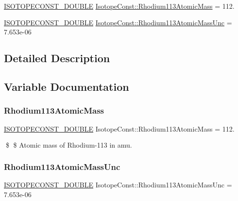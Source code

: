 \begin{DoxyCompactItemize}
\item 
\mbox{\hyperlink{group___isotope_const-_macros_ga8f45a7272ce02c0b4c65c44636ed719a}{I\+S\+O\+T\+O\+P\+E\+C\+O\+N\+S\+T\+\_\+\+D\+O\+U\+B\+LE}} \mbox{\hyperlink{group___isotope_const-_rhodium-_rh113_gaaa9f14440ee148fc73f50ecc7192ccc6}{Isotope\+Const\+::\+Rhodium113\+Atomic\+Mass}} = 112.
\item 
\mbox{\hyperlink{group___isotope_const-_macros_ga8f45a7272ce02c0b4c65c44636ed719a}{I\+S\+O\+T\+O\+P\+E\+C\+O\+N\+S\+T\+\_\+\+D\+O\+U\+B\+LE}} \mbox{\hyperlink{group___isotope_const-_rhodium-_rh113_gafec6a5d8fc996f13c23779efdc7ba580}{Isotope\+Const\+::\+Rhodium113\+Atomic\+Mass\+Unc}} = 7.\+653e-\/06
\end{DoxyCompactItemize}


\subsection{Detailed Description}


\subsection{Variable Documentation}
\mbox{\label{group___isotope_const-_rhodium-_rh113_gaaa9f14440ee148fc73f50ecc7192ccc6}} 
\subsubsection{\texorpdfstring{Rhodium113\+Atomic\+Mass}{Rhodium113AtomicMass}}
{\footnotesize\ttfamily \mbox{\hyperlink{group___isotope_const-_macros_ga8f45a7272ce02c0b4c65c44636ed719a}{I\+S\+O\+T\+O\+P\+E\+C\+O\+N\+S\+T\+\_\+\+D\+O\+U\+B\+LE}} Isotope\+Const\+::\+Rhodium113\+Atomic\+Mass = 112.}

\$ \$ Atomic mass of Rhodium-\/113 in amu. \mbox{\label{group___isotope_const-_rhodium-_rh113_gafec6a5d8fc996f13c23779efdc7ba580}} 
\subsubsection{\texorpdfstring{Rhodium113\+Atomic\+Mass\+Unc}{Rhodium113AtomicMassUnc}}
{\footnotesize\ttfamily \mbox{\hyperlink{group___isotope_const-_macros_ga8f45a7272ce02c0b4c65c44636ed719a}{I\+S\+O\+T\+O\+P\+E\+C\+O\+N\+S\+T\+\_\+\+D\+O\+U\+B\+LE}} Isotope\+Const\+::\+Rhodium113\+Atomic\+Mass\+Unc = 7.\+653e-\/06}

